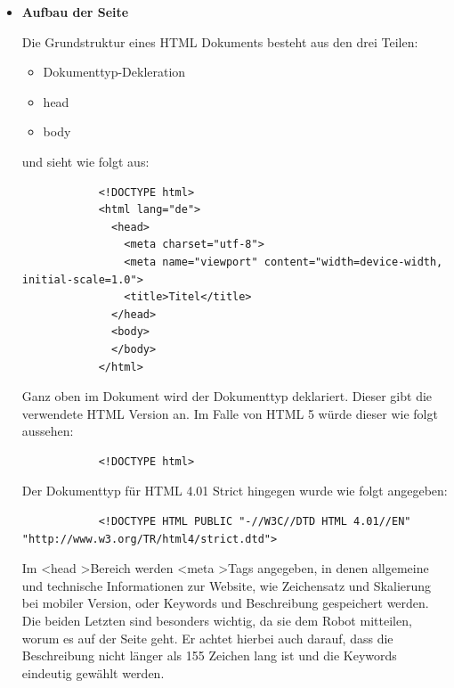 {    \begin{itemize}
      \item \textbf{Aufbau der Seite}

        Die Grundstruktur eines HTML Dokuments besteht aus den drei Teilen:

        \begin{itemize}
          \item Dokumenttyp-Dekleration
          \item head
          \item body
        \end{itemize}

        und sieht wie folgt aus:

        \lstset{language=html}
        	\begin{lstlisting}
            <!DOCTYPE html>
            <html lang="de">
              <head>
                <meta charset="utf-8">
                <meta name="viewport" content="width=device-width, initial-scale=1.0">
                <title>Titel</title>
              </head>
              <body>
              </body>
            </html>
        	\end{lstlisting}

        Ganz oben im Dokument wird der Dokumenttyp deklariert. Dieser gibt die verwendete HTML Version an. Im Falle von HTML 5 würde dieser wie folgt aussehen:

        \lstset{language=html}
        	\begin{lstlisting}
            <!DOCTYPE html>
        	\end{lstlisting}

        Der Dokumenttyp für HTML 4.01 Strict hingegen wurde wie folgt angegeben:

        \lstset{language=html}
        	\begin{lstlisting}
            <!DOCTYPE HTML PUBLIC "-//W3C//DTD HTML 4.01//EN" "http://www.w3.org/TR/html4/strict.dtd">
        	\end{lstlisting}

        Im \textless head \textgreater Bereich werden \textless meta \textgreater Tags angegeben, in denen allgemeine und technische Informationen zur Website, wie Zeichensatz
        und Skalierung bei mobiler Version, oder Keywords und Beschreibung gespeichert werden.
        Die beiden Letzten sind besonders wichtig, da sie dem Robot mitteilen, worum es auf der Seite geht. Er achtet hierbei auch darauf, dass die Beschreibung nicht
        länger als 155 Zeichen lang ist und die Keywords eindeutig gewählt werden.


\end{itemize}}
